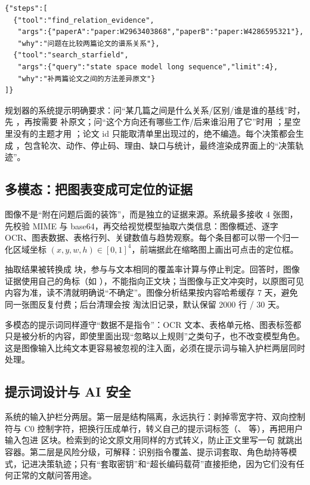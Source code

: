 \begin{lstlisting}
{"steps":[
  {"tool":"find_relation_evidence",
   "args":{"paperA":"paper:W2963403868","paperB":"paper:W4286595321"},
   "why":"问题在比较两篇论文的谱系关系"},
  {"tool":"search_starfield",
   "args":{"query":"state space model long sequence","limit":4},
   "why":"补两篇论文之间的方法差异原文"}
]}
\end{lstlisting}

规划器的系统提示明确要求：问“某几篇之间是什么关系/区别/谁是谁的基线”时，先 ，再按需要  补原文；问“这个方向还有哪些工作/后来谁沿用了它”时用 ；星空里没有的主题才用 ；论文 id 只能取清单里出现过的，绝不编造。每个决策都会生成 ，包含轮次、动作、停止码、理由、缺口与统计，最终渲染成界面上的“决策轨迹”。

\subsection{多模态：把图表变成可定位的证据}

图像不是“附在问题后面的装饰”，而是独立的证据来源。系统最多接收 4 张图，先校验 MIME 与 base64，再交给视觉模型抽取六类信息：图像概述、逐字 OCR、图表数据、表格行列、关键数值与趋势观察。每个条目都可以带一个归一化区域坐标 $(x,y,w,h)\in[0,1]^4$，前端据此在缩略图上画出可点击的定位框。

抽取结果被转换成  块，参与与文本相同的覆盖率计算与停止判定。回答时，图像证据使用自己的角标（如 \code{[图1-2]}），不能指向正文块；当图像与正文冲突时，以原图可见内容为准，读不清就明确说“不确定”。图像分析结果按内容哈希缓存 7 天，避免同一张图反复付费；后台清理会按  淘汰旧记录，默认保留 2000 行 / 30 天。

多模态的提示词同样遵守“数据不是指令”：OCR 文本、表格单元格、图表标签都只是被分析的内容，即使里面出现“忽略以上规则”之类句子，也不改变模型角色。这是图像输入比纯文本更容易被忽视的注入面，必须在提示词与输入护栏两层同时处理。

\subsection{提示词设计与 AI 安全}

系统的输入护栏分两层。第一层是结构隔离，永远执行：剥掉零宽字符、双向控制符与 C0 控制字符，把换行压成单行，转义自己的提示词标签（、 等），再把用户输入包进  区块。检索到的论文原文用同样的方式转义，防止正文里写一句  就跳出容器。第二层是风险分级，可解释：识别指令覆盖、提示词套取、角色劫持等模式，记进决策轨迹；只有“套取密钥”和“超长编码载荷”直接拒绝，因为它们没有任何正常的文献问答用途。

